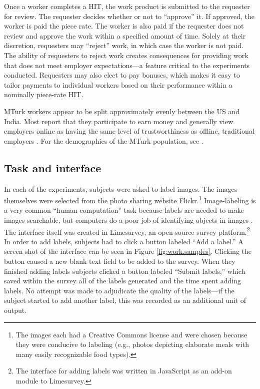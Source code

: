 \documentclass[12pt]{article}
\begin{document}
Once a worker completes a HIT, the work product is submitted to the
requester for review. The requester decides whether or not to
``approve'' it. If approved, the worker is paid the piece rate. The
worker is also paid if the requester does not review and approve the
work within a specified amount of time. Solely at their discretion,
requesters may ``reject'' work, in which case the worker is not
paid. The ability of requesters to reject work creates consequences
for providing work that does not meet employer expectations---a
feature critical to the experiments conducted. Requesters may also
elect to pay bonuses, which makes it easy to tailor payments to
individual workers based on their performance within a nominally
piece-rate HIT.

MTurk workers appear to be split approximately evenly between the US
and India. Most report that they participate to earn money and
generally view employers online as having the same level of
trustworthiness as offline, traditional employers
\citep{horton2010condition}. For the demographics of the MTurk
population, see \cite{ipeirotis2010}.

\subsection{Task and interface}
In each of the experiments, subjects were asked to label images. The
images themselves were selected from the photo sharing website
Flickr.\footnote{The images each had a Creative Commons license and
  were chosen because they were conducive to labeling (e.g., photos
  depicting elaborate meals with many easily recognizable food
  types).} Image-labeling is a very common ``human computation'' task
because labels are needed to make images searchable, but computers do
a poor job of identifying objects in images \citep{von2004labeling,
  huang2010toward}. The interface itself was created in Limesurvey, an
open-source survey platform.\footnote{The interface for adding labels
  was written in JavaScript as an add-on module to Limesurvey.} In
order to add labels, subjects had to click a button labeled ``Add a
label.''  A screen shot of the interface can be seen in Figure
\ref{fig:work.samples}.  Clicking the button caused a new blank text
field to be added to the survey. When they finished adding labels
subjects clicked a button labeled ``Submit labels,'' which saved
within the survey all of the labels generated and the time spent
adding labels. No attempt was made to adjudicate the quality of the
labels---if the subject started to add another label, this was
recorded as an additional unit of output.
\end{document}

